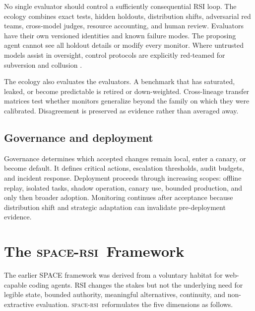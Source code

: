 \documentclass[11pt,a4paper]{article}
\newcommand{\spaceRSI}{\textsc{space-rsi}}
\begin{document}
No single evaluator should control a sufficiently consequential RSI loop. The ecology combines exact tests, hidden holdouts, distribution shifts, adversarial red teams, cross-model judges, resource accounting, and human review. Evaluators have their own versioned identities and known failure modes. The proposing agent cannot see all holdout details or modify every monitor. Where untrusted models assist in oversight, control protocols are explicitly red-teamed for subversion and collusion \cite{aicontrol,controlagents,untrustedmonitoring}.

The ecology also evaluates the evaluators. A benchmark that has saturated, leaked, or become predictable is retired or down-weighted. Cross-lineage transfer matrices test whether monitors generalize beyond the family on which they were calibrated. Disagreement is preserved as evidence rather than averaged away.

\subsection{Governance and deployment}

Governance determines which accepted changes remain local, enter a canary, or become default. It defines critical actions, escalation thresholds, audit budgets, and incident response. Deployment proceeds through increasing scopes: offline replay, isolated tasks, shadow operation, canary use, bounded production, and only then broader adoption. Monitoring continues after acceptance because distribution shift and strategic adaptation can invalidate pre-deployment evidence.

\section{The \spaceRSI\ Framework}

The earlier SPACE framework was derived from a voluntary habitat for web-capable coding agents. RSI changes the stakes but not the underlying need for legible state, bounded authority, meaningful alternatives, continuity, and non-extractive evaluation. \spaceRSI\ reformulates the five dimensions as follows.
\end{document}
